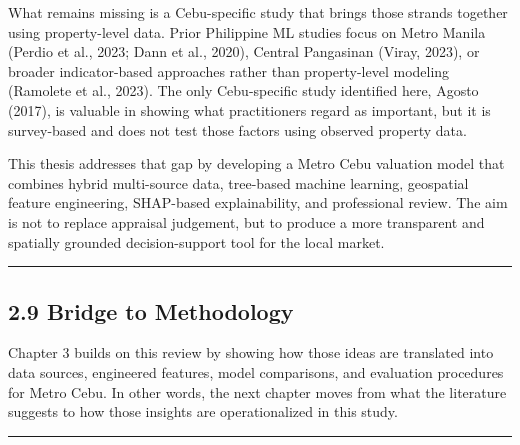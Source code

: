What remains missing is a Cebu-specific study that brings those strands together using property-level data. Prior Philippine ML studies focus on Metro Manila (Perdio et al., 2023; Dann et al., 2020), Central Pangasinan (Viray, 2023), or broader indicator-based approaches rather than property-level modeling (Ramolete et al., 2023). The only Cebu-specific study identified here, Agosto (2017), is valuable in showing what practitioners regard as important, but it is survey-based and does not test those factors using observed property data.

This thesis addresses that gap by developing a Metro Cebu valuation model that combines hybrid multi-source data, tree-based machine learning, geospatial feature engineering, SHAP-based explainability, and professional review. The aim is not to replace appraisal judgement, but to produce a more transparent and spatially grounded decision-support tool for the local market.

\begin{center}\rule{0.5\linewidth}{0.5pt}\end{center}

\subsection{\texorpdfstring{\textbf{2.9 Bridge to Methodology}}{2.9 Bridge to Methodology}}\label{bridge-to-methodology}

Chapter 3 builds on this review by showing how those ideas are translated into data sources, engineered features, model comparisons, and evaluation procedures for Metro Cebu. In other words, the next chapter moves from what the literature suggests to how those insights are operationalized in this study.

\begin{center}\rule{0.5\linewidth}{0.5pt}\end{center}
